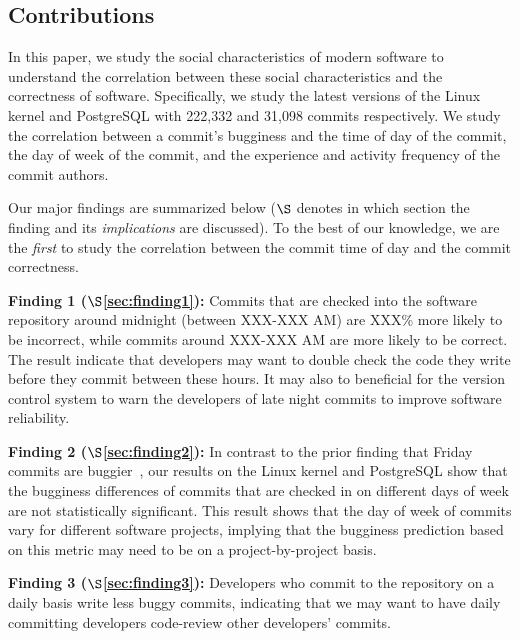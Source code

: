 \subsection{Contributions}
In this paper, we study the social characteristics of modern software to understand 
the correlation between these social characteristics and the correctness of software.  
Specifically, we study the latest versions of the Linux kernel and PostgreSQL with 222,332 and 31,098 commits respectively.
We study the correlation between a commit's bugginess
and the time of day of the commit, the day of week of the commit, and
the experience and activity frequency of the commit authors.

Our major findings 
are summarized below ($\S$ denotes in which
section the finding and its {\em implications} are discussed). To the best of our
knowledge, we are the {\em first} to study the correlation between the commit time of day and
the commit correctness. 

\begin{list}{}{\topsep=0pt\parsep=0pt\leftmargin=9pt\itemindent=0pt}

\vspace{0.05in}
\item {\bf Finding 1 ($\S$\ref{sec:finding1}):} 
Commits that are checked into the software repository around midnight (between XXX-XXX AM) 
are XXX\% more likely to be incorrect, while commits around XXX-XXX AM are more likely to be correct.
The result indicate that developers may want to double check the code they write  
before they commit between these hours. It may also to beneficial for the version control
system to warn the developers of late night commits to improve software reliability. 

\item {\bf Finding 2 ($\S$\ref{sec:finding2}):} 
In contrast to the prior finding that Friday commits are buggier~\cite{sliwerski-msr-2005}, 
our results on the Linux kernel and PostgreSQL show that 
the bugginess differences of commits that are checked in on different days of week 
are not statistically significant. This result shows that the day of week of commits
vary for different software projects, implying that the bugginess prediction based on this 
metric may need to be on a project-by-project basis.

\item {\bf Finding 3 ($\S$\ref{sec:finding3}):} 
Developers who commit to the repository on a daily basis
write less buggy commits, indicating that we may want to have daily
committing developers code-review other developers' commits.

\end{list}


